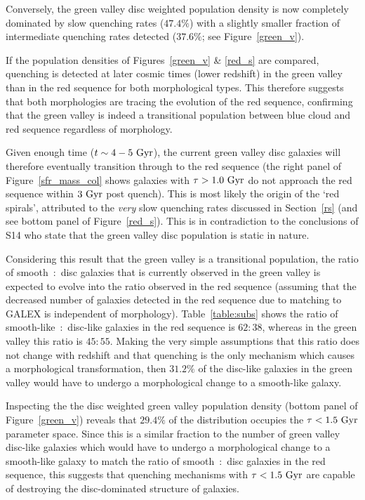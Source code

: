 Conversely, the green valley disc weighted population density is now completely dominated by slow quenching rates ($47.4\%$) with a slightly smaller fraction of intermediate quenching rates detected ($37.6\%$; see Figure~\ref{green_v}).

If the population densities of Figures~\ref{green_v} \& \ref{red_s} are compared, quenching is detected at later cosmic times (lower redshift) in the green valley than in the red sequence for both morphological types. This therefore suggests that both morphologies are tracing the evolution of the red sequence, confirming that the green valley is indeed a transitional population between blue cloud and red sequence regardless of morphology. 

Given enough time ($t\sim4 - 5~\rm{Gyr}$), the current green valley disc galaxies will therefore eventually transition through to the red sequence (the right panel of Figure~\ref{sfr_mass_col} shows galaxies with $\tau > 1.0~\rm{Gyr}$ do not approach the red sequence within $3~\rm{Gyr}$ post quench). This is most likely the origin of the `red spirals', attributed to the \emph{very} slow quenching rates discussed in Section~\ref{rs} (and see bottom panel of Figure~\ref{red_s}). This is in contradiction to the conclusions of S14 who state that the green valley disc population is static in nature. 

Considering this result that the green valley is a transitional population, the ratio of smooth~:~disc galaxies that is currently observed in the green valley is expected to evolve into the ratio observed in the red sequence (assuming that the decreased number of galaxies detected in the red sequence due to matching to GALEX is independent of morphology). Table~\ref{table:subs} shows the ratio of smooth-like~:~disc-like galaxies in the red sequence is $62:38$, whereas in the green valley this ratio is $45:55$. Making the very simple assumptions that this ratio does not change with redshift and that quenching is the only mechanism which causes a morphological transformation, then $31.2\%$ of the disc-like galaxies in the green valley would have to undergo a morphological change to a smooth-like galaxy. 

Inspecting the the disc weighted green valley population density (bottom panel of Figure~\ref{green_v}) reveals that $29.4\%$ of the distribution occupies the $\tau < 1.5 ~\rm{Gyr}$ parameter space. Since this is a similar fraction to the number of green valley disc-like galaxies which would have to undergo a morphological change to a smooth-like galaxy to match the ratio of smooth~:~disc galaxies in the red sequence, this suggests that quenching mechanisms with $\tau < 1.5 ~\rm{Gyr}$ are capable of destroying the disc-dominated structure of galaxies. 

